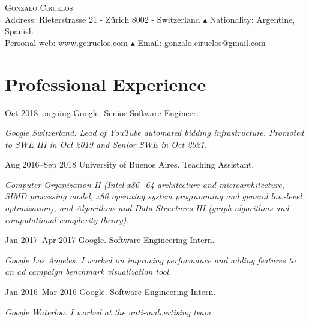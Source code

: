 \documentclass[a4paper,english,10pt]{article}
\begin{document}
\pagestyle{empty}

\begin{center}

  \Large{\textsc{Gonzalo Ciruelos}}\\
  \vspace{0.3em}
\footnotesize{
  Address: Rieterstrasse 21 - Z\"urich 8002 - Switzerland $\blacktriangle$ Nationality: Argentine, Spanish \\
  Personal web: \href{http://www.gciruelos.com}{www.gciruelos.com} $\blacktriangle$ Email: gonzalo.ciruelos@gmail.com
}
\end{center}


\section{Professional Experience}
\begin{CV}
\item[Oct 2018--ongoing] Google. Senior Software Engineer.\newline
  \begin{footnotesize}
  \emph{Google Switzerland. Lead of YouTube automated bidding infrastructure. Promoted to SWE III in Oct 2019 and Senior SWE in Oct 2021.}
  \end{footnotesize}
\item[Aug 2016--Sep 2018] University of Buenos Aires. Teaching Assistant.\newline
  \begin{footnotesize}
  \emph{Computer Organization II (Intel x86\_64 architecture and microarchitecture, SIMD processing model, x86 operating system programming and general low-level optimization), and Algorithms and Data Structures III (graph algorithms and computational complexity theory).}
  \end{footnotesize}
\item[Jan 2017--Apr 2017] Google. Software Engineering Intern.\newline
  \begin{footnotesize}
  \emph{Google Los Angeles. I worked on improving performance and adding features to an ad campaign benchmark visualization tool.}
  \end{footnotesize}
\item[Jan 2016--Mar 2016] Google. Software Engineering Intern.\newline
  \begin{footnotesize}
  \emph{Google Waterloo. I worked at the anti-malvertising team.}
  \end{footnotesize}
\end{CV}
\end{document}
